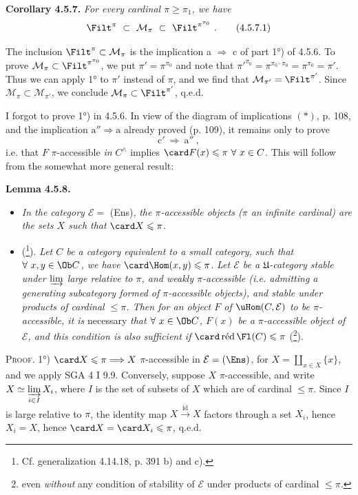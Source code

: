 \textbf{Corollary 4.5.7.} \textit{For every cardinal $\pi \geqslant \pi_1$, we have}
\[
\Filt^\pi \ \subset \ \mathcal{M}_\pi \ \subset \ \Filt^{\pi^{\pi_0}} \ . \tag*{(4.5.7.1)}
\]

The inclusion $\Filt^\pi \subset \mathcal{M}_\pi$ is the implication a $\Longrightarrow$ c of part 1°) of 4.5.6. To prove $\mathcal{M}_\pi \subset \Filt^{\pi^{\pi_0}}$, we put $\pi' = \pi^{\pi_0}$ and note that $\pi'^{\pi_0} = \pi^{\pi_0 \cdot \pi_0} = \pi^{\pi_0} = \pi'$. Thus we can
apply 1° to $\pi'$ instead of $\pi$, and we find that $\mathcal{M}_{\pi'} = \Filt^{\pi'}$. Since $\mathcal{M}_\pi \subset \mathcal{M}_{\pi'}$, we conclude $\mathcal{M}_\pi \subset \Filt^{\pi'}$, q.e.d.

I forgot to prove 1°) in 4.5.6. In view of the diagram of implications $(\ast)$, p. 108, and the implication $\mathrm{a}'' \Longrightarrow \mathrm{a}$ already proved (p. 109),
it remains only to prove
\[
\mathrm{c}' \ \Longrightarrow \ \mathrm{a}'' \ ,
\]
i.e. that $F$ $\pi$-accessible \textit{in} $C^\wedge$ implies $\card F(x) \leqslant \pi \ \forall \ x \in C$. This will follow from the somewhat more general result:

\textbf{Lemma 4.5.8.}
\begin{itemize}[leftmargin=3em]
\item[\textit{1°)}] \textit{In the category $\mathcal{E} = $} (Ens), \textit{the $\pi$-accessible objects ($\pi$ an infinite cardinal) are the sets $X$ such that} $\card X \leqslant \pi$.
\item[\textit{2°)}] (\footnote{Cf. generalization 4.14.18, p. 391 b) and c).}). \textit{Let $C$ be a category equivalent to a small category, such that $\forall \ x, y \in \Ob C$, we have} $\card \Hom(x,y) \leqslant \pi$. \textit{Let $\mathcal{E}$ be a $\mathfrak{U}$-category stable under $\varinjlim$ large relative to $\pi$, and weakly $\pi$-accessible (i.e. admitting a generating subcategory formed of $\pi$-accessible objects), and stable under products of cardinal $\leqslant \pi$. Then for an object $F$ of $\uHom(C,\mathcal{E})$ to be $\pi$-accessible, it is} necessary \textit{that $\forall \ x \in \Ob C$, $F(x)$ be a $\pi$-accessible object of $\mathcal{E}$, and this condition is also sufficient if} $\card \operatorname{\text{réd}} \Fl(C) \leqslant \pi$ (\footnote{even \textit{without} any condition of stability of $\mathcal{E}$ under products of cardinal $\leqslant \pi$.}).
\end{itemize}

\textsc{Proof.} 1°) $\card X \leqslant \pi \Longrightarrow X$ $\pi$-accessible in $\mathcal{E} = (\Ens)$, for $X = \coprod_{x \in X} \{x\}$, and we apply SGA 4 I 9.9. Conversely, suppose $X$ $\pi$-accessible, and write $X \simeq \varinjlim\limits_{i \in I} X_i$, where $I$ is the set of subsets of $X$ which are of cardinal $\leqslant \pi$. Since $I$ is large relative to $\pi$, the identity map $X \xrightarrow{\ \mathrm{id}\ } X$ factors through a set $X_i$, hence $X_i = X$, hence $\card X = \card X_i \leqslant \pi$, q.e.d.

